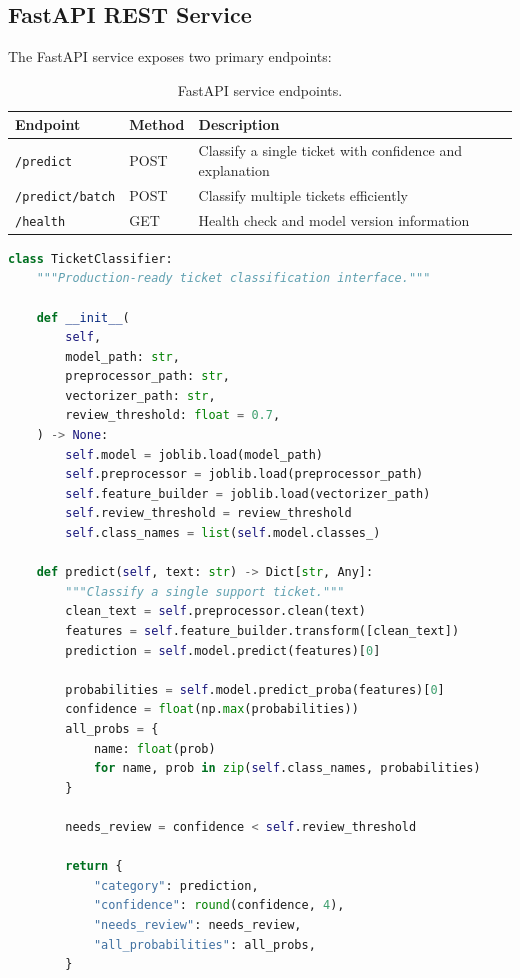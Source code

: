 \documentclass[12pt,a4paper]{article}
\renewcommand{\arraystretch}{1.5}
\newcommand{\goldrowcolors}{%
    \rowcolors{2}{bgCard}{bgDark}%
}
\newcommand{\tableheader}[1]{\textcolor{accentGold}{\textbf{#1}}}
\newcommand{\tablehdrrow}{\rowcolor{accentCard}}
\begin{document}
\subsection{FastAPI REST Service}
\label{subsec:fastapi}

The FastAPI service exposes two primary endpoints:

\begin{table}[H]
\centering
\goldrowcolors
\renewcommand{\arraystretch}{1.5}
\begin{tabular}{@{}L{3cm} V L{3cm} V L{7cm}@{}}
\toprule
\tablehdrrow
\tableheader{Endpoint} & \tableheader{Method} & \tableheader{Description} \\
\midrule
\texttt{/predict} & POST & Classify a single ticket with confidence and explanation \\
\texttt{/predict/batch} & POST & Classify multiple tickets efficiently \\
\texttt{/health} & GET & Health check and model version information \\
\bottomrule
\end{tabular}
\caption{FastAPI service endpoints.}
\label{tab:endpoints}
\end{table}

\begin{lstlisting}[language=Python, caption={TicketClassifier inference class (\texttt{src/models/predict\_model.py})}]
class TicketClassifier:
    """Production-ready ticket classification interface."""

    def __init__(
        self,
        model_path: str,
        preprocessor_path: str,
        vectorizer_path: str,
        review_threshold: float = 0.7,
    ) -> None:
        self.model = joblib.load(model_path)
        self.preprocessor = joblib.load(preprocessor_path)
        self.feature_builder = joblib.load(vectorizer_path)
        self.review_threshold = review_threshold
        self.class_names = list(self.model.classes_)

    def predict(self, text: str) -> Dict[str, Any]:
        """Classify a single support ticket."""
        clean_text = self.preprocessor.clean(text)
        features = self.feature_builder.transform([clean_text])
        prediction = self.model.predict(features)[0]

        probabilities = self.model.predict_proba(features)[0]
        confidence = float(np.max(probabilities))
        all_probs = {
            name: float(prob)
            for name, prob in zip(self.class_names, probabilities)
        }

        needs_review = confidence < self.review_threshold

        return {
            "category": prediction,
            "confidence": round(confidence, 4),
            "needs_review": needs_review,
            "all_probabilities": all_probs,
        }
\end{lstlisting}
\end{document}
